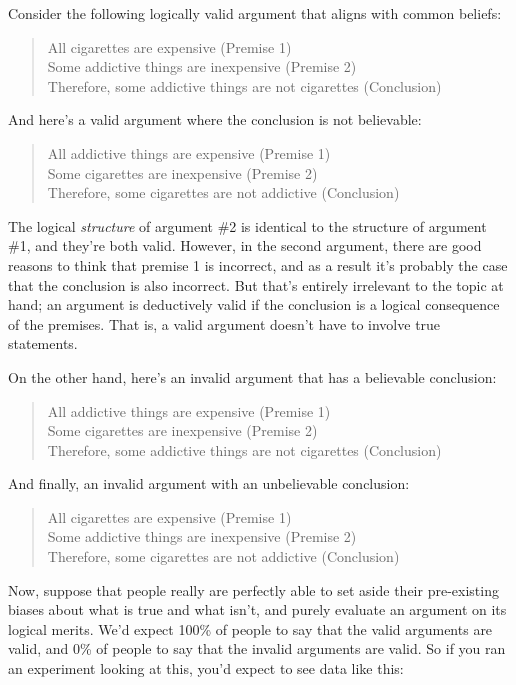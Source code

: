 Consider the following logically valid argument that aligns with common beliefs:
\begin{quote}
All cigarettes are expensive (Premise 1) \\
Some addictive things are inexpensive (Premise 2)\\
Therefore, some addictive things are not cigarettes (Conclusion)
\end{quote}
And here's a valid argument where the conclusion is not believable:
\begin{quote}
All addictive things are expensive (Premise 1)\\
Some cigarettes are inexpensive (Premise 2)\\
Therefore, some cigarettes are not addictive (Conclusion)
\end{quote}
The logical {\it structure} of argument \#2 is identical to the structure of argument \#1, and they're both valid. However, in the second argument, there are good reasons to think that premise 1 is incorrect, and as a result it's probably the case that the conclusion is also incorrect. But that's entirely irrelevant to the topic at hand; an argument is deductively valid if the conclusion is a logical consequence of the premises. That is, a valid argument doesn't have to involve true statements.

On the other hand, here's an invalid argument that has a believable conclusion:
\begin{quote}
All addictive things are expensive (Premise 1)\\
Some cigarettes are inexpensive (Premise 2)\\
Therefore, some addictive things are not cigarettes (Conclusion)
\end{quote}
And finally, an invalid argument with an unbelievable conclusion:
\begin{quote}
All cigarettes are expensive (Premise 1)\\
Some addictive things are inexpensive (Premise 2)\\
Therefore, some cigarettes are not addictive (Conclusion)
\end{quote}
Now, suppose that people really are perfectly able to set aside their pre-existing biases about what is true and what isn't, and purely evaluate an argument on its logical merits. We'd expect 100\% of people to say that the valid arguments are valid, and 0\% of people to say that the invalid arguments are valid. So if you ran an experiment looking at this, you'd expect to see data like this:

